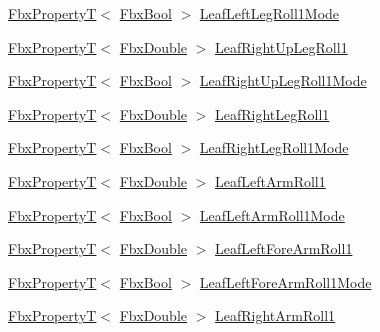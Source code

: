 \begin{DoxyCompactItemize}
\item 
\hyperlink{class_fbx_property_t}{Fbx\+PropertyT}$<$ \hyperlink{fbxtypes_8h_a92e0562b2fe33e76a242f498b362262e}{Fbx\+Bool} $>$ \hyperlink{class_fbx_character_a30ebf3e0212bc7339ec5a0131dbec5d5}{Leaf\+Left\+Leg\+Roll1\+Mode}
\item 
\hyperlink{class_fbx_property_t}{Fbx\+PropertyT}$<$ \hyperlink{fbxtypes_8h_a171e72a1c46fc15c1a6c9c31948c1c5b}{Fbx\+Double} $>$ \hyperlink{class_fbx_character_a953eee696f80e4e09e25e0e43b120935}{Leaf\+Right\+Up\+Leg\+Roll1}
\item 
\hyperlink{class_fbx_property_t}{Fbx\+PropertyT}$<$ \hyperlink{fbxtypes_8h_a92e0562b2fe33e76a242f498b362262e}{Fbx\+Bool} $>$ \hyperlink{class_fbx_character_a3dd0e08f6023f75e7cddf7bf256925d5}{Leaf\+Right\+Up\+Leg\+Roll1\+Mode}
\item 
\hyperlink{class_fbx_property_t}{Fbx\+PropertyT}$<$ \hyperlink{fbxtypes_8h_a171e72a1c46fc15c1a6c9c31948c1c5b}{Fbx\+Double} $>$ \hyperlink{class_fbx_character_aa1841fa4418840236b459f9cb04c1244}{Leaf\+Right\+Leg\+Roll1}
\item 
\hyperlink{class_fbx_property_t}{Fbx\+PropertyT}$<$ \hyperlink{fbxtypes_8h_a92e0562b2fe33e76a242f498b362262e}{Fbx\+Bool} $>$ \hyperlink{class_fbx_character_ae77c249e4396d92d42a10cba450af36d}{Leaf\+Right\+Leg\+Roll1\+Mode}
\item 
\hyperlink{class_fbx_property_t}{Fbx\+PropertyT}$<$ \hyperlink{fbxtypes_8h_a171e72a1c46fc15c1a6c9c31948c1c5b}{Fbx\+Double} $>$ \hyperlink{class_fbx_character_a06d07e0ace0fd744c0df69d43e49dc57}{Leaf\+Left\+Arm\+Roll1}
\item 
\hyperlink{class_fbx_property_t}{Fbx\+PropertyT}$<$ \hyperlink{fbxtypes_8h_a92e0562b2fe33e76a242f498b362262e}{Fbx\+Bool} $>$ \hyperlink{class_fbx_character_ae546e2447e220885cb97b9f27eed09e1}{Leaf\+Left\+Arm\+Roll1\+Mode}
\item 
\hyperlink{class_fbx_property_t}{Fbx\+PropertyT}$<$ \hyperlink{fbxtypes_8h_a171e72a1c46fc15c1a6c9c31948c1c5b}{Fbx\+Double} $>$ \hyperlink{class_fbx_character_a667959babe164a1a1caed384f4060480}{Leaf\+Left\+Fore\+Arm\+Roll1}
\item 
\hyperlink{class_fbx_property_t}{Fbx\+PropertyT}$<$ \hyperlink{fbxtypes_8h_a92e0562b2fe33e76a242f498b362262e}{Fbx\+Bool} $>$ \hyperlink{class_fbx_character_a2ecfa46345f8c11460d243efbbd81dbc}{Leaf\+Left\+Fore\+Arm\+Roll1\+Mode}
\item 
\hyperlink{class_fbx_property_t}{Fbx\+PropertyT}$<$ \hyperlink{fbxtypes_8h_a171e72a1c46fc15c1a6c9c31948c1c5b}{Fbx\+Double} $>$ \hyperlink{class_fbx_character_a4fa8ff40ed607255a808f3452d2c0cee}{Leaf\+Right\+Arm\+Roll1}

\end{DoxyCompactItemize}
